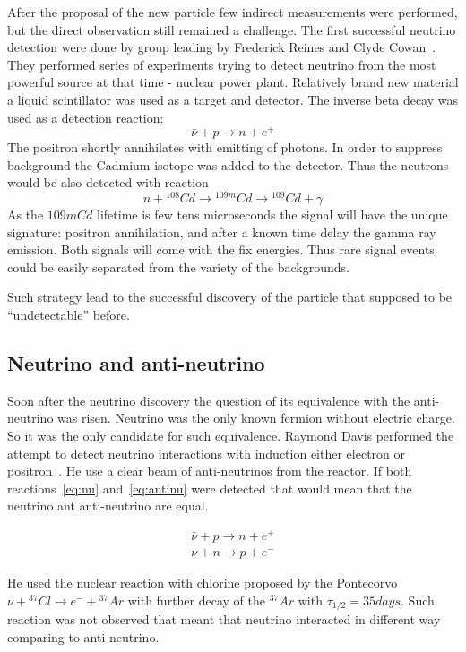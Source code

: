 \documentclass[../main.tex]{subfiles}
\begin{document}
After the proposal of the new particle few indirect measurements were performed, but the direct observation still remained a challenge. The first successful neutrino detection were done by group leading by Frederick Reines and Clyde Cowan~\cite{Cowan1956}. They performed series of experiments trying to detect neutrino from the most powerful source at that time - nuclear power plant. Relatively brand new material a liquid scintillator was used as a target and detector. The inverse beta decay was used as a detection reaction:
\begin{equation}
\bar{\nu}+p\to n+e^+
\end{equation}
The positron shortly annihilates with emitting of photons. In order to suppress background the Cadmium isotope was added to the detector. Thus the neutrons would be also detected with reaction
\begin{equation}
n+{}^{108}Cd\to{}^{109m}Cd\to{}^{109}Cd+\gamma
\end{equation}
As the ${109m}Cd$ lifetime is few tens microseconds the signal will have the unique signature: positron annihilation, and after a known time delay the gamma ray emission. Both signals will come with the fix energies. Thus rare signal events could be easily separated from the variety of the backgrounds.

Such strategy lead to the successful discovery of the particle that supposed to be ``undetectable'' before.

\subsection{Neutrino and anti-neutrino}
\label{sec:anti}
Soon after the neutrino discovery the question of its equivalence with the anti-neutrino was risen. Neutrino was the only known fermion without electric charge. So it was the only candidate for such equivalence. Raymond Davis performed the attempt to detect neutrino interactions with induction either electron or positron~\cite{Davis1955}. He use a clear beam of anti-neutrinos from the reactor. If both reactions~\autoref{eq:nu} and~\autoref{eq:antinu} were detected that would mean that the neutrino ant anti-neutrino are equal.

\begin{eqnarray}
\label{eq:nu}
\bar{\nu}+p\rightarrow n+e^+ \\
\nu+n\rightarrow p+e^-
\label{eq:antinu}
\end{eqnarray}

He used the nuclear reaction with chlorine proposed by the Pontecorvo $\nu+{}^{37}Cl\to e^-+{}^{37}Ar$ with further decay of the ${}^{37}Ar$ with $\tau_{1/2}=35 days$. Such reaction was not observed that meant that neutrino interacted in different way comparing to anti-neutrino.
\end{document}
